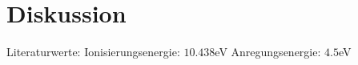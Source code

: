 \section{Diskussion}
\label{sec:Diskussion}
 Literaturwerte: Ionisierungsenergie: $10.438$eV \cite{ion}
                 Anregungsenergie: $4.5$eV \cite{anr}